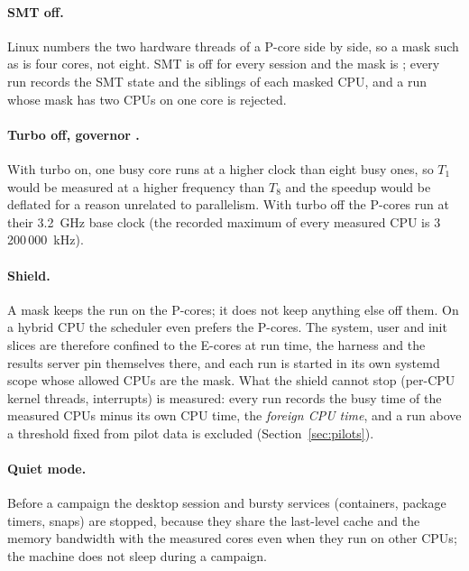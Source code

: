 \paragraph{SMT off.} Linux numbers the two hardware threads of a P-core side
by side, so a mask such as  is four cores, not eight. SMT is off
for every session and the mask is ; every run
records the SMT state and the siblings of each masked CPU, and a run whose
mask has two CPUs on one core is rejected.

\paragraph{Turbo off, governor .} With turbo on, one busy
core runs at a higher clock than eight busy ones, so $T_1$ would be measured
at a higher frequency than $T_8$ and the speedup would be deflated for a
reason unrelated to parallelism. With turbo off the P-cores run at their
3.2~GHz base clock (the recorded maximum of every measured CPU is
3\,200\,000~kHz).

\paragraph{Shield.} A mask keeps the run on the P-cores; it does not keep
anything else off them. On a hybrid CPU the scheduler even prefers the
P-cores. The system, user and init slices are therefore confined to the
E-cores at run time, the harness and the results server pin themselves
there, and each run is started in its own systemd scope whose allowed CPUs
are the mask. What the shield cannot stop (per-CPU kernel threads,
interrupts) is measured: every run records the busy time of the measured
CPUs minus its own CPU time, the \emph{foreign CPU time}, and a run above a
threshold fixed from pilot data is excluded (Section~\ref{sec:pilots}).

\paragraph{Quiet mode.} Before a campaign the desktop session and bursty
services (containers, package timers, snaps) are stopped, because they share
the last-level cache and the memory bandwidth with the measured cores even
when they run on other CPUs; the machine does not sleep during a campaign.

